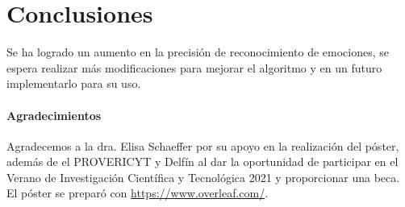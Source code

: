 \documentclass[a4]{sciposter}
\begin{document}
\begin{multicols}{2}
\begin{table}
\setcounter{table}{0} %
\captionsetup{type=table} %
\caption{Aquí explicas cómo interpreta el cuadro.}
\label{data}
\begin{center}
\end{center}
\end{table}

\section{Conclusiones}

Se ha logrado un aumento en la precisión de reconocimiento de emociones, se espera realizar más modificaciones para mejorar el algoritmo y en un futuro implementarlo para su uso.

\paragraph{Agradecimientos}

{\small Agradecemos a la dra. Elisa Schaeffer por su apoyo en la realización del póster, además de el PROVERICYT y Delfín al dar la oportunidad de participar en el Verano de Investigación Científica y Tecnológica 2021 y proporcionar una beca.
El póster se preparó con \url{https://www.overleaf.com/}.}

\end{multicols}



\end{document}
